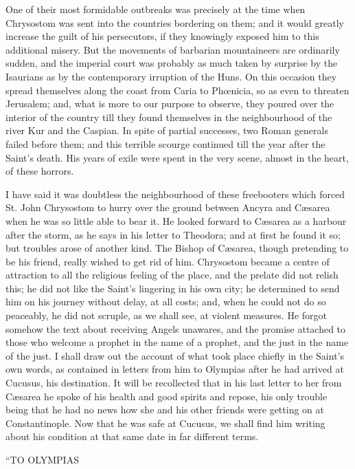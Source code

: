 One of their most formidable outbreaks was precisely at the time
when Chrysostom was sent into the countries bordering on them; and it
would greatly increase the guilt of his persecutors, if they knowingly
exposed him to this additional misery. But the movements of barbarian
mountaineers are ordinarily sudden, and the imperial court was
probably as much taken by surprise by the Isaurians as by the
contemporary irruption of the Huns. On this occasion they spread
themselves along the coast from Caria to Phœnicia, so as even to
threaten Jerusalem; and, what is more to our purpose to observe, they
poured over the interior of the country till they found themselves in
the neighbourhood of the river Kur and the Caspian. In spite of
partial successes, two Roman generals failed before them; and this
terrible scourge continued till the year after the Saint's death. His
years of exile were spent in the very scene, almost in the heart, of
these horrors.

I have said it was doubtless the neighbourhood of these freebooters
which forced St. John Chrysostom to hurry over the ground between
Ancyra and Cæsarea when he was so little able to bear it. He looked
forward to Cæsarea as a harbour after the storm, as he says in his
letter to Theodora; and at first he found it so; but troubles arose of
another kind. The Bishop of Cæsarea, though pretending to be his
friend, really wished to get rid of him. Chrysostom became a centre of
attraction to all the religious feeling of the place, and the prelate
did not relish this; he did not like the Saint's lingering in his own
city; he determined to send him on his journey without delay, at all
costs; and, when he could not do so peaceably, he did not scruple, as
we shall see, at violent measures. He forgot somehow the text
about receiving Angels unawares, and the promise attached to those who
welcome a prophet in the name of a prophet, and the just in the name
of the just. I shall draw out the account of what took place chiefly
in the Saint's own words, as contained in letters from him to Olympias
after he had arrived at Cucusus, his destination. It will be
recollected that in his last letter to her from Cæsarea he spoke of
his health and good spirits and repose, his only trouble being that he
had no news how she and his other friends were getting on at
Constantinople. Now that he was safe at Cucusus, we shall find him
writing about his condition at that same date in far different terms.

``TO
OLYMPIAS

